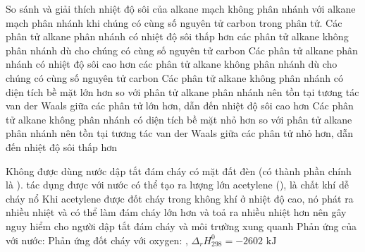 \documentclass[12pt,a4paper]{article}
\begin{document}
\begin{ex}
So sánh và giải thích nhiệt độ sôi của alkane mạch không phân nhánh với alkane mạch phân nhánh khi chúng có cùng số nguyên tử carbon trong phân tử.
\choiceTF
{\True Các phân tử alkane phân nhánh có nhiệt độ sôi thấp hơn các phân tử alkane không phân nhánh dù cho chúng có cùng số nguyên tử carbon}
{Các phân tử alkane phân nhánh có nhiệt độ sôi cao hơn các phân tử alkane không phân nhánh dù cho chúng có cùng số nguyên tử carbon}
{\True Các phân tử alkane không phân nhánh có diện tích bề mặt lớn hơn so với phân tử alkane phân nhánh nên tồn tại tương tác van der Waals giữa các phân tử lớn hơn, dẫn đến nhiệt độ sôi cao hơn}
{Các phân tử alkane không phân nhánh có diện tích bề mặt nhỏ hơn so với phân tử alkane phân nhánh nên tồn tại tương tác van der Waals giữa các phân tử nhỏ hơn, dẫn đến nhiệt độ sôi thấp hơn}
\end{ex}

\begin{ex}
Không được dùng nước dập tắt đám cháy có mặt đất đèn (có thành phần chính là ).
\choiceTF
{\True {} tác dụng được với nước có thể tạo ra lượng lớn acetylene (), là chất khí dễ cháy nổ}
{\True Khi acetylene được đốt cháy trong không khí ở nhiệt độ cao, nó phát ra nhiều nhiệt và có thể làm đám cháy lớn hơn và toả ra nhiều nhiệt hơn nên gây nguy hiểm cho người dập tắt đám cháy và môi trường xung quanh}
{\True Phản ứng của  với nước: }
{\True Phản ứng đốt cháy  với oxygen: , $\Delta_r H^0_{298} = -2602\text{ kJ}$}
\end{ex}
\end{document}

